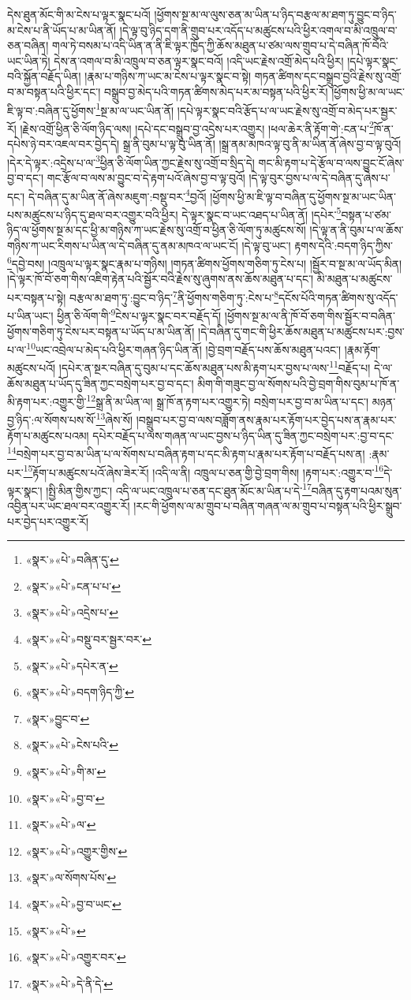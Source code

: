 དེས་ཐུན་མོང་གི་མ་ངེས་པ་ལྟར་སྣང་པའོ། །ཕྱོགས་སྔ་མ་ལ་ལུས་ཅན་མ་ཡིན་པ་ཉིད་བརྩལ་མ་ཐག་ཏུ་བྱུང་བ་ཉིད་མ་ངེས་པ་ནི་ཡོད་པ་མ་ཡིན་ནོ། །དེ་ལྟ་བུ་ཉིད་དག་ནི་གྲུབ་པར་འདོད་པ་མཚུངས་པའི་ཕྱིར་འགལ་བ་མི་འཁྲུལ་བ་ཅན་བཞིན། གལ་ཏེ་བསམ་པ་འདི་ཡིན་ན་ནི་ཇི་ལྟར་ཁྱོད་ཀྱི་ཆོས་མཐུན་པ་ཙམ་ལས་གྲུབ་པ་དེ་བཞིན་ཁོ་བོའི་ཡང་ཡིན་ཏེ། དེས་ན་འགལ་བ་མི་འཁྲུལ་བ་ཅན་ལྟར་སྣང་བའོ། །འདི་ཡང་རྗེས་འགྲོ་མེད་པའི་ཕྱིར། །དཔེ་ལྟར་སྣང་བའི་སྐྱོན་བརྗོད་ཡིན། །རྣམ་པ་གཉིས་ཀ་ཡང་མ་ངེས་པ་ལྟར་སྣང་བ་སྟེ། གཏན་ཚིགས་དང་བསྒྲུབ་བྱའི་རྗེས་སུ་འགྲོ་བ་མ་བསྟན་པའི་ཕྱིར་དང་། བསྒྲུབ་བྱ་མེད་པའི་གཏན་ཚིགས་མེད་པར་མ་བསྟན་པའི་ཕྱིར་རོ། །ཕྱོགས་ཕྱི་མ་ལ་ཡང་ཇི་ལྟ་བ་:བཞིན་དུ་ཕྱོགས་\footnote{«སྣར་»«པེ་»བཞིན་དུ་}སྔ་མ་ལ་ཡང་ཡིན་ནོ། །དཔེ་ལྟར་སྣང་བའི་རྩོད་པ་ལ་ཡང་རྗེས་སུ་འགྲོ་བ་མེད་པར་སྦྱར་རོ། །རྗེས་འགྲོ་ཕྱིན་ཅི་ལོག་ཉིད་ལས། །དཔེ་དང་བསྒྲུབ་བྱ་འདྲེས་པར་འགྱུར། །ཕལ་ཆེར་ནི་རྟོག་གེ་:ངན་པ་\footnote{«སྣར་»«པེ་»ངན་པ་པ་}ཁོ་ན་དཔེས་ཉེ་བར་འཇལ་བར་བྱེད་དེ། སྒྲ་ནི་བུམ་པ་ལྟ་བུ་ཡིན་ནོ། །སྒྲ་ནམ་མཁའ་ལྟ་བུ་ནི་མ་ཡིན་ནོ་ཞེས་བྱ་བ་ལྟ་བུའོ། །དེར་དེ་ལྟར་:འདྲེས་པ་ལ་\footnote{«སྣར་»«པེ་»འདྲེས་པ་}ཕྱིན་ཅི་ལོག་ཡིན་ཀྱང་རྗེས་སུ་འགྲོ་བ་སྲིད་དེ། གང་མི་རྟག་པ་དེ་རྩོལ་བ་ལས་བྱུང་ངོ་ཞེས་བྱ་བ་དང་། གང་རྩོལ་བ་ལས་མ་བྱུང་བ་དེ་རྟག་པའོ་ཞེས་བྱ་བ་ལྟ་བུའོ། །དེ་ལྟ་བུར་བྱས་པ་ལ་དེ་བཞིན་དུ་ཞེས་པ་དང་། དེ་བཞིན་དུ་མ་ཡིན་ནོ་ཞེས་མཇུག་:བསྡུ་བར་\footnote{«སྣར་»«པེ་»བསྡུ་བར་སྦྱར་བར་}བྱའོ། །ཕྱོགས་ཕྱི་མ་ཇི་ལྟ་བ་བཞིན་དུ་ཕྱོགས་སྔ་མ་ཡང་ཡིན་པས་མཚུངས་པ་ཉིད་དུ་ཐལ་བར་འགྱུར་བའི་ཕྱིར། དེ་ལྟར་སྣང་བ་ཡང་འཐད་པ་ཡིན་ནོ། །དཔེར་\footnote{«སྣར་»«པེ་»དཔེར་ན་}བསྟན་པ་ཙམ་ཉིད་ལ་ཕྱོགས་སྔ་མ་དང་ཕྱི་མ་གཉིས་ཀ་ཡང་རྗེས་སུ་འགྲོ་བ་ཕྱིན་ཅི་ལོག་ཏུ་མཚུངས་སོ། །དེ་ལྟ་ན་ནི་བུམ་པ་ལ་ཆོས་གཉིས་ཀ་ཡང་རིགས་པ་ཡིན་ལ་དེ་བཞིན་དུ་ནམ་མཁའ་ལ་ཡང་ངོ། །དེ་ལྟ་བུ་ཡང་། རྟགས་དེའི་:བདག་ཉིད་ཀྱིས་\footnote{«སྣར་»«པེ་»བདག་ཉིད་ཀྱི་}དབྱེ་བས། །འཁྲུལ་པ་ལྟར་སྣང་རྣམ་པ་གཉིས། །གཏན་ཚིགས་ཕྱོགས་གཅིག་ཏུ་ངེས་པ། །སྦྱོར་བ་སྔ་མ་ལ་ཡོད་མིན། །དེ་ལྟར་ཁོ་བོ་ཅག་གིས་འཇིག་རྟེན་པའི་སྦྱོར་བའི་རྗེས་སུ་ཞུགས་ནས་ཆོས་མཐུན་པ་དང་། མི་མཐུན་པ་མཚུངས་པར་བསྟན་པ་སྟེ། བརྩལ་མ་ཐག་ཏུ་:བྱུང་བ་ཉིད་\footnote{«སྣར་»བྱུང་བ་}ནི་ཕྱོགས་གཅིག་ཏུ་:ངེས་པ་\footnote{«སྣར་»«པེ་»ངེས་པའི་}དངོས་པོའི་གཏན་ཚིགས་སུ་འདོད་པ་ཡིན་ཡང་། ཕྱིན་ཅི་ལོག་གི་\footnote{«སྣར་»«པེ་»གི་མ་}ངེས་པ་ལྟར་སྣང་བར་བརྗོད་དོ། །ཕྱོགས་སྔ་མ་ལ་ནི་ཁོ་བོ་ཅག་གིས་སྦྱོར་བ་བཞིན་ཕྱོགས་གཅིག་ཏུ་ངེས་པར་བསྟན་པ་ཡོད་པ་མ་ཡིན་ནོ། །དེ་བཞིན་དུ་གང་གི་ཕྱིར་ཆོས་མཐུན་པ་མཚུངས་པར་:བྱས་པ་ལ་\footnote{«སྣར་»«པེ་»བྱ་བ་}ཡང་འབྲེལ་པ་མེད་པའི་ཕྱིར་གཞན་ཉིད་ཡིན་ནོ། །བྱེ་བྲག་བརྗོད་པས་ཆོས་མཐུན་པའང་། །རྣམ་རྟོག་མཚུངས་པའོ། །དཔེར་ན་སྔར་བཞིན་དུ་བུམ་པ་དང་ཆོས་མཐུན་པས་མི་རྟག་པར་བྱས་པ་ལས་\footnote{«སྣར་»«པེ་»ལ་}བརྗོད་པ། དེ་ལ་ཆོས་མཐུན་པ་ཡོད་དུ་ཟིན་ཀྱང་བསྲེག་པར་བྱ་བ་དང་། མིག་གི་གཟུང་བྱ་ལ་སོགས་པའི་བྱེ་བྲག་གིས་བུམ་པ་ཁོ་ན་མི་རྟག་པར་:འགྱུར་གྱི་\footnote{«སྣར་»«པེ་»འགྱུར་གྱིས་}སྒྲ་ནི་མ་ཡིན་ལ། སྒྲ་ཁོ་ན་རྟག་པར་འགྱུར་ཏེ། བསྲེག་པར་བྱ་བ་མ་ཡིན་པ་དང་། མཉན་བྱ་ཉིད་:ལ་སོགས་པས་སོ་\footnote{«སྣར་»ལ་སོགས་པོས་}ཞེས་སོ། །བསྒྲུབ་པར་བྱ་བ་ལས་བཟློག་ནས་རྣམ་པར་རྟོག་པར་བྱེད་པས་ན་རྣམ་པར་རྟོག་པ་མཚུངས་པའམ། དཔེར་བརྗོད་པ་ལས་གཞན་ལ་ཡང་བྱས་པ་ཉིད་ཡིན་དུ་ཟིན་ཀྱང་བསྲེག་པར་:བྱ་བ་དང་\footnote{«སྣར་»«པེ་»བྱ་བ་ཡང་}བསྲེག་པར་བྱ་བ་མ་ཡིན་པ་ལ་སོགས་པ་བཞིན་རྟག་པ་དང་མི་རྟག་པ་རྣམ་པར་རྟོག་པ་བརྗོད་པས་ན། :རྣམ་པར་\footnote{«སྣར་»«པེ་»}རྟོག་པ་མཚུངས་པའོ་ཞེས་ཟེར་རོ། །འདི་ལ་ནི། འཁྲུལ་པ་ཅན་གྱི་བྱེ་བྲག་གིས། །རྟག་པར་:འགྱུར་བ་\footnote{«སྣར་»«པེ་»འགྱུར་བར་}དེ་ལྟར་སྣང་། །སྤྱི་མིན་གྱིས་ཀྱང་། འདི་ལ་ཡང་འཁྲུལ་པ་ཅན་དང་ཐུན་མོང་མ་ཡིན་པ་དེ་\footnote{«སྣར་»«པེ་»དེ་ནི་དེ་}བཞིན་དུ་རྟག་པའམ་སུན་འབྱིན་པར་ཡང་ཐལ་བར་འགྱུར་རོ། །རང་གི་ཕྱོགས་ལ་མ་གྲུབ་པ་བཞིན་གཞན་ལ་མ་གྲུབ་པ་བསྟན་པའི་ཕྱིར་སྒྲུབ་པར་བྱེད་པར་འགྱུར་རོ། 